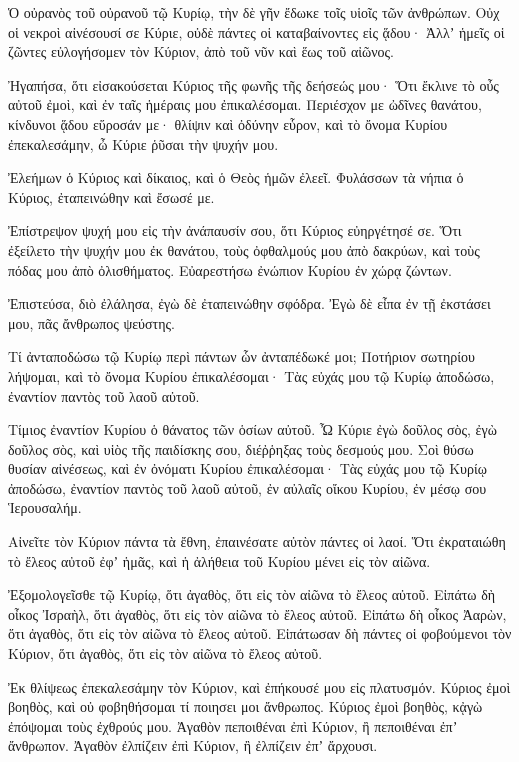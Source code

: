 \begin{spacing}{1.1}
\begin{multicols}{2}
Ὁ οὐρανὸς τοῦ οὐρανοῦ τῷ Κυρίῳ, τὴν δὲ γῆν ἔδωκε τοῖς υἱοῖς τῶν ἀνθρώπων.
Οὐχ οἱ νεκροὶ αἰνέσουσί σε Κύριε, οὐδὲ πάντες οἱ καταβαίνοντες εἰς ᾅδου·
Ἀλλʼ ἡμεῖς οἱ ζῶντες εὐλογήσομεν τὸν Κύριον, ἀπὸ τοῦ νῦν καὶ ἕως τοῦ αἰῶνος.

Ἠγαπήσα, ὅτι εἰσακούσεται Κύριος τῆς φωνῆς τῆς δεήσεώς μου·
Ὅτι ἔκλινε τὸ οὖς αὐτοῦ ἐμοὶ, καὶ ἐν ταῖς ἡμέραις μου ἐπικαλέσομαι.
Περιέσχον με ὠδῖνες θανάτου, κίνδυνοι ᾅδου εὕροσάν με· θλίψιν καὶ ὀδύνην εὗρον,
καὶ τὸ ὄνομα Κυρίου ἐπεκαλεσάμην, ὦ Κύριε ῥῦσαι τὴν ψυχήν μου.

Ἐλεήμων ὁ Κύριος καὶ δίκαιος, καὶ ὁ Θεὸς ἡμῶν ἐλεεῖ.
Φυλάσσων τὰ νήπια ὁ Κύριος, ἐταπεινώθην καὶ ἔσωσέ με.

Ἐπίστρεψον ψυχή μου εἰς τὴν ἀνάπαυσίν σου, ὅτι Κύριος εὐηργέτησέ σε.
Ὅτι ἐξείλετο τὴν ψυχήν μου ἐκ θανάτου, τοὺς ὀφθαλμούς μου ἀπὸ δακρύων, καὶ τοὺς πόδας μου ἀπὸ ὀλισθήματος.
Εὐαρεστήσω ἐνώπιον Κυρίου ἐν χώρᾳ ζώντων.

Ἐπιστεύσα, διὸ ἐλάλησα, ἐγὼ δὲ ἐταπεινώθην σφόδρα.
Ἐγὼ δὲ εἶπα ἐν τῇ ἐκστάσει μου, πᾶς ἄνθρωπος ψεύστης.

Τί ἀνταποδώσω τῷ Κυρίῳ περὶ πάντων ὧν ἀνταπέδωκέ μοι;
Ποτήριον σωτηρίου λήψομαι, καὶ τὸ ὄνομα Κυρίου ἐπικαλέσομαι·
Τὰς εὐχάς μου τῷ Κυρίῳ ἀποδώσω, ἐναντίον παντὸς τοῦ λαοῦ αὐτοῦ.

Τίμιος ἐναντίον Κυρίου ὁ θάνατος τῶν ὁσίων αὐτοῦ.
Ὦ Κύριε ἐγὼ δοῦλος σὸς, ἐγὼ δοῦλος σὸς, καὶ υἱὸς τῆς παιδίσκης σου, διέῤῥηξας τοὺς δεσμούς μου.
Σοὶ θύσω θυσίαν αἰνέσεως, καὶ ἐν ὀνόματι Κυρίου ἐπικαλέσομαι·
Τὰς εὐχάς μου τῷ Κυρίῳ ἀποδώσω, ἐναντίον παντὸς τοῦ λαοῦ αὐτοῦ,
ἐν αὐλαῖς οἴκου Κυρίου, ἐν μέσῳ σου Ἱερουσαλήμ.

Αἰνεῖτε τὸν Κύριον πάντα τὰ ἔθνη, ἐπαινέσατε αὐτὸν πάντες οἱ λαοί.
Ὅτι ἐκραταιώθη τὸ ἔλεος αὐτοῦ ἐφʼ ἡμᾶς, καὶ ἡ ἀλήθεια τοῦ Κυρίου μένει εἰς τὸν αἰῶνα.

Ἐξομολογεῖσθε τῷ Κυρίῳ, ὅτι ἀγαθὸς, ὅτι εἰς τὸν αἰῶνα τὸ ἔλεος αὐτοῦ.
Εἰπάτω δὴ οἶκος Ἰσραὴλ, ὅτι ἀγαθὸς, ὅτι εἰς τὸν αἰῶνα τὸ ἔλεος αὐτοῦ.
Εἰπάτω δὴ οἶκος Ἀαρὼν, ὅτι ἀγαθὸς, ὅτι εἰς τὸν αἰῶνα τὸ ἔλεος αὐτοῦ.
Εἰπάτωσαν δὴ πάντες οἱ φοβούμενοι τὸν Κύριον, ὅτι ἀγαθὸς, ὅτι εἰς τὸν αἰῶνα τὸ ἔλεος αὐτοῦ.

Ἐκ θλίψεως ἐπεκαλεσάμην τὸν Κύριον, καὶ ἐπήκουσέ μου εἰς πλατυσμόν.
Κύριος ἐμοὶ βοηθὸς, καὶ οὐ φοβηθήσομαι τί ποιησει μοι ἄνθρωπος.
Κύριος ἐμοὶ βοηθὸς, κᾀγὼ ἐπόψομαι τοὺς ἐχθρούς μου.
Ἀγαθὸν πεποιθέναι ἐπὶ Κύριον, ἢ πεποιθέναι ἐπʼ ἄνθρωπον.
Ἀγαθὸν ἐλπίζειν ἐπὶ Κύριον, ἢ ἐλπίζειν ἐπʼ ἄρχουσι.


\end{multicols}
\end{spacing}
